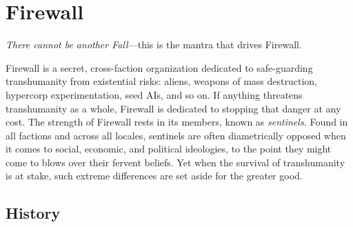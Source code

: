 \section{Firewall} 

\textit{There cannot be another Fall}—this is the mantra that drives Firewall. 

Firewall is a secret, cross-faction organization dedicated to safe-guarding transhumanity from existential risks: aliens, weapons of mass destruction, hypercorp experimentation, seed AIs, and so on. If anything threatens transhumanity as a whole, Firewall is dedicated to stopping that danger at any cost. The strength of Firewall rests in its members, known as \textit{sentinels.} Found in all factions and across all locales, sentinels are often diametrically opposed when it comes to social, economic, and political ideologies, to the point they might come to blows over their fervent beliefs. Yet when the survival of transhumanity is at stake, such extreme differences are set aside for the greater good. 

\subsection{History} 

